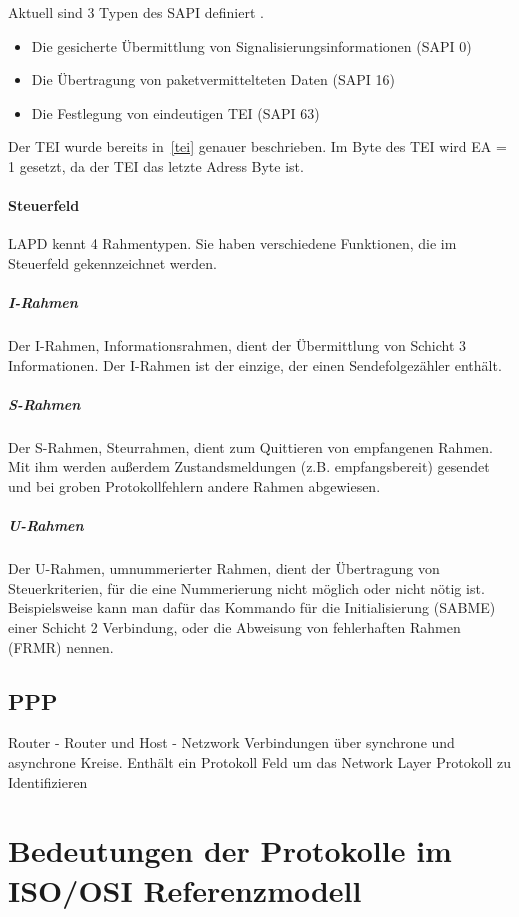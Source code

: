 \documentclass[12pt, a4paper, ngerman]{article}
\newcommand{\osi}{ISO/OSI Referenzmodell\xspace}
\begin{document}
Aktuell sind 3 Typen des SAPI definiert \cite{SWB-098672061}. 
\begin{itemize}
	\item Die gesicherte Übermittlung von Signalisierungsinformationen (SAPI 0)
	\item Die Übertragung von paketvermittelteten Daten (SAPI 16)
	\item Die Festlegung von eindeutigen TEI (SAPI 63)
\end{itemize}



Der TEI wurde bereits in~\ref{tei} genauer beschrieben. Im Byte des TEI wird EA = 1 gesetzt, da der TEI das letzte Adress Byte ist.

\paragraph{Steuerfeld}
LAPD kennt 4 Rahmentypen. Sie haben verschiedene Funktionen, die im Steuerfeld gekennzeichnet werden.

\subparagraph{I-Rahmen}
Der I-Rahmen, Informationsrahmen, dient der Übermittlung von Schicht 3 Informationen. Der I-Rahmen ist der einzige, der einen Sendefolgezähler enthält.

\subparagraph{S-Rahmen}
Der S-Rahmen, Steurrahmen, dient zum Quittieren von empfangenen Rahmen. Mit ihm werden außerdem Zustandsmeldungen (z.B. empfangsbereit) gesendet und bei groben Protokollfehlern andere Rahmen abgewiesen.

\subparagraph{U-Rahmen}
Der U-Rahmen, umnummerierter Rahmen, dient der Übertragung von Steuerkriterien, für die eine Nummerierung nicht möglich oder nicht nötig ist. Beispielsweise kann man dafür das Kommando für die Initialisierung (SABME) einer Schicht 2 Verbindung, oder die Abweisung von fehlerhaften Rahmen (FRMR) nennen.

\subsection{PPP}
Router - Router und Host - Netzwork Verbindungen über synchrone und asynchrone Kreise. Enthält ein Protokoll Feld um das Network Layer Protokoll zu Identifizieren \cite[S. 102]{SWB-107223570}  

\section{Bedeutungen der Protokolle im \osi }

\nocite{*} 

\newpage
\sloppy
\printbibliography 



\newpage
\listoffigures
\end{document}
